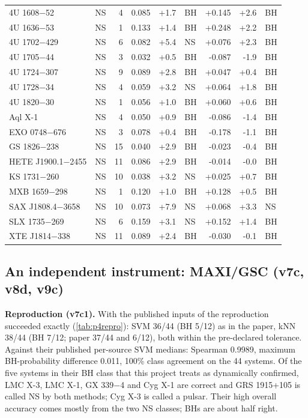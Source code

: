 {\begin{longtable}{@{}llrrrlrrl@{}}
4U 1608$-$52 & NS & 4 & 0.085 & +1.7 & BH & +0.145 & +2.6 & BH \\
4U 1636$-$53 & NS & 1 & 0.133 & +1.4 & BH & +0.248 & +2.2 & BH \\
4U 1702$-$429 & NS & 6 & 0.082 & +5.4 & NS & +0.076 & +2.3 & BH \\
4U 1705$-$44 & NS & 3 & 0.032 & +0.5 & BH & -0.087 & -1.9 & BH \\
4U 1724$-$307 & NS & 9 & 0.089 & +2.8 & BH & +0.047 & +0.4 & BH \\
4U 1728$-$34 & NS & 4 & 0.059 & +3.2 & NS & +0.064 & +1.8 & BH \\
4U 1820$-$30 & NS & 1 & 0.056 & +1.0 & BH & +0.060 & +0.6 & BH \\
Aql X-1 & NS & 4 & 0.050 & +0.9 & BH & -0.086 & -1.4 & BH \\
EXO 0748$-$676 & NS & 3 & 0.078 & +0.4 & BH & -0.178 & -1.1 & BH \\
GS 1826$-$238 & NS & 15 & 0.040 & +2.9 & BH & -0.023 & -0.4 & BH \\
HETE J1900.1$-$2455 & NS & 11 & 0.086 & +2.9 & BH & -0.014 & -0.0 & BH \\
KS 1731$-$260 & NS & 10 & 0.038 & +3.2 & NS & +0.025 & +0.7 & BH \\
MXB 1659$-$298 & NS & 1 & 0.120 & +1.0 & BH & +0.128 & +0.5 & BH \\
SAX J1808.4$-$3658 & NS & 10 & 0.073 & +7.9 & NS & +0.068 & +3.3 & NS \\
SLX 1735$-$269 & NS & 6 & 0.159 & +3.1 & NS & +0.152 & +1.4 & BH \\
XTE J1814$-$338 & NS & 11 & 0.089 & +2.4 & BH & -0.030 & -0.1 & BH \\
\end{longtable}}

\subsection{An independent instrument: MAXI/GSC (v7c, v8d, v9c)}\label{sec:p4maxi}
\textbf{Reproduction (v7c1).} With the published inputs of \citet{deBeurs2022} the reproduction succeeded exactly
(\cref{tab:p4repro}): SVM 36/44 (BH 5/12) as in the paper, kNN 38/44 (BH 7/12; paper 37/44 and 6/12), both within the
pre-declared tolerance. Against their published per-source SVM medians: Spearman 0.9989, maximum BH-probability difference
0.011, 100\% class agreement on the 44 systems. Of the five systems in their BH class that this project treats as dynamically
confirmed, LMC X-3, LMC X-1, GX 339$-$4 and Cyg X-1 are correct and GRS 1915+105 is called NS by both methods; Cyg X-3 is called a
pulsar. Their high overall accuracy comes mostly from the two NS classes; BHs are about half right.

